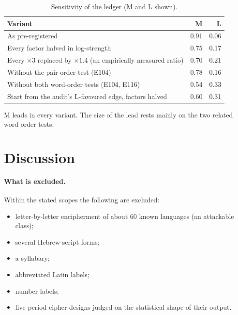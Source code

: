 \documentclass[11pt,a4paper]{article}
\begin{document}
\begin{table}[ht]\small
\caption{Sensitivity of the ledger (M and L shown).}\label{tab:sens}
\begin{tabularx}{\textwidth}{@{}Yrr@{}}\toprule
Variant & M & L\\\midrule
As pre-registered & 0.91 & 0.06\\
Every factor halved in log-strength & 0.75 & 0.17\\
Every $\times3$ replaced by $\times1.4$ (an empirically measured ratio) & 0.70 & 0.21\\
Without the pair-order test (E104) & 0.78 & 0.16\\
Without both word-order tests (E104, E116) & 0.54 & 0.33\\
Start from the audit's L-favoured edge, factors halved & 0.60 & 0.31\\\bottomrule
\end{tabularx}
\end{table}

M leads in every variant. The size of the lead rests mainly on the two related word-order tests.

\section{Discussion}
\paragraph{What is excluded.} Within the stated scopes the following are excluded:
\begin{itemize}
\item letter-by-letter encipherment of about 60 known languages (an attackable class);
\item several Hebrew-script forms;
\item a syllabary;
\item abbreviated Latin labels;
\item number labels;
\item five period cipher designs judged on the statistical shape of their output.
\end{itemize}
\end{document}
